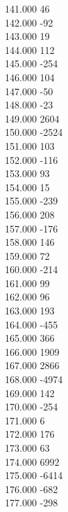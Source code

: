 { 141.000	46 \\
 142.000	-92 \\
 143.000	19 \\
 144.000	112 \\
 145.000	-254 \\
 146.000	104 \\
 147.000	-50 \\
 148.000	-23 \\
 149.000	2604 \\
 150.000	-2524 \\
 151.000	103 \\
 152.000	-116 \\
 153.000	93 \\
 154.000	15 \\
 155.000	-239 \\
 156.000	208 \\
 157.000	-176 \\
 158.000	146 \\
 159.000	72 \\
 160.000	-214 \\
 161.000	99 \\
 162.000	96 \\
 163.000	193 \\
 164.000	-455 \\
 165.000	366 \\
 166.000	1909 \\
 167.000	2866 \\
 168.000	-4974 \\
 169.000	142 \\
 170.000	-254 \\
 171.000	6 \\
 172.000	176 \\
 173.000	63 \\
 174.000	6992 \\
 175.000	-6414 \\
 176.000	-682 \\
 177.000	-298 \\
}
